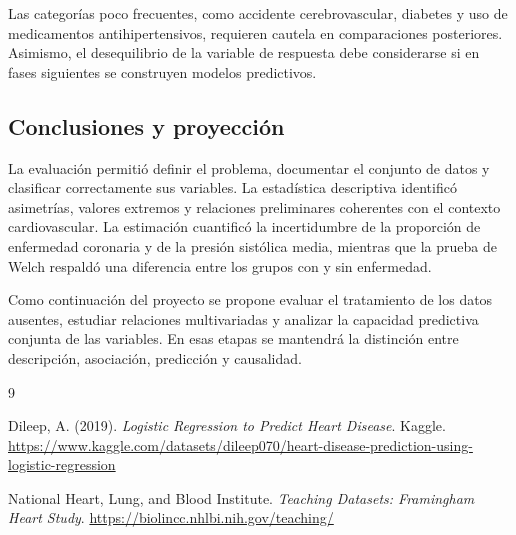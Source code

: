 \documentclass[11pt,a4paper]{article}
\begin{document}
Las categorías poco frecuentes, como accidente cerebrovascular, diabetes y uso de medicamentos antihipertensivos, requieren cautela en comparaciones posteriores. Asimismo, el desequilibrio de la variable de respuesta debe considerarse si en fases siguientes se construyen modelos predictivos.

\subsection{Conclusiones y proyección}

La evaluación permitió definir el problema, documentar el conjunto de datos y clasificar correctamente sus variables. La estadística descriptiva identificó asimetrías, valores extremos y relaciones preliminares coherentes con el contexto cardiovascular. La estimación cuantificó la incertidumbre de la proporción de enfermedad coronaria y de la presión sistólica media, mientras que la prueba de Welch respaldó una diferencia entre los grupos con y sin enfermedad.

Como continuación del proyecto se propone evaluar el tratamiento de los datos ausentes, estudiar relaciones multivariadas y analizar la capacidad predictiva conjunta de las variables. En esas etapas se mantendrá la distinción entre descripción, asociación, predicción y causalidad.


\begin{thebibliography}{9}
\raggedright

Dileep, A. (2019).
\textit{Logistic Regression to Predict Heart Disease}.
Kaggle.
\url{https://www.kaggle.com/datasets/dileep070/heart-disease-prediction-using-logistic-regression}

National Heart, Lung, and Blood Institute.
\textit{Teaching Datasets: Framingham Heart Study}.
\url{https://biolincc.nhlbi.nih.gov/teaching/}

\end{thebibliography}
\end{document}
